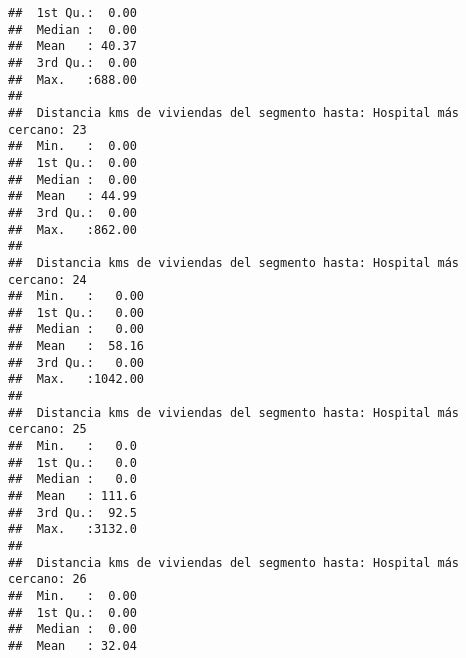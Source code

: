 \documentclass[11pt,]{article}
\begin{document}
\begin{verbatim}
##  1st Qu.:  0.00                                                         
##  Median :  0.00                                                         
##  Mean   : 40.37                                                         
##  3rd Qu.:  0.00                                                         
##  Max.   :688.00                                                         
##                                                                         
##  Distancia kms de viviendas del segmento hasta: Hospital más cercano: 23
##  Min.   :  0.00                                                         
##  1st Qu.:  0.00                                                         
##  Median :  0.00                                                         
##  Mean   : 44.99                                                         
##  3rd Qu.:  0.00                                                         
##  Max.   :862.00                                                         
##                                                                         
##  Distancia kms de viviendas del segmento hasta: Hospital más cercano: 24
##  Min.   :   0.00                                                        
##  1st Qu.:   0.00                                                        
##  Median :   0.00                                                        
##  Mean   :  58.16                                                        
##  3rd Qu.:   0.00                                                        
##  Max.   :1042.00                                                        
##                                                                         
##  Distancia kms de viviendas del segmento hasta: Hospital más cercano: 25
##  Min.   :   0.0                                                         
##  1st Qu.:   0.0                                                         
##  Median :   0.0                                                         
##  Mean   : 111.6                                                         
##  3rd Qu.:  92.5                                                         
##  Max.   :3132.0                                                         
##                                                                         
##  Distancia kms de viviendas del segmento hasta: Hospital más cercano: 26
##  Min.   :  0.00                                                         
##  1st Qu.:  0.00                                                         
##  Median :  0.00                                                         
##  Mean   : 32.04                                                         

\end{verbatim}
\end{document}
